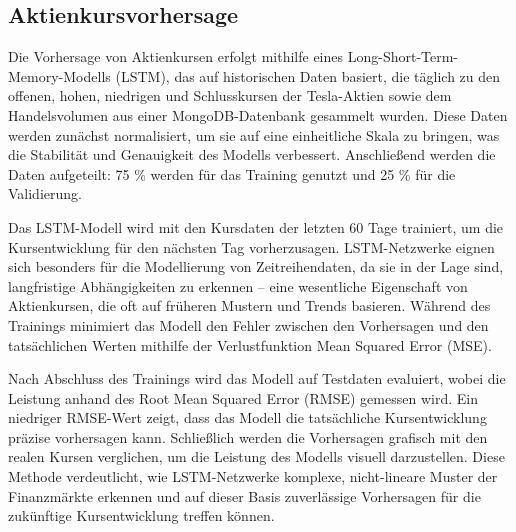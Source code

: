 \documentclass[conference,a4paper,flushend]{cs-techrep}
\begin{document}
\subsection{Aktienkursvorhersage}
Die Vorhersage von Aktienkursen erfolgt mithilfe eines Long-Short-Term-Memory-Modells (LSTM), das auf historischen Daten basiert, die täglich zu den offenen, hohen, niedrigen und Schlusskursen der Tesla-Aktien sowie dem Handelsvolumen aus einer MongoDB-Datenbank gesammelt wurden. Diese Daten werden zunächst normalisiert, um sie auf eine einheitliche Skala zu bringen, was die Stabilität und Genauigkeit des Modells verbessert. Anschließend werden die Daten aufgeteilt: 75 \% werden für das Training genutzt und 25 \% für die Validierung.

Das LSTM-Modell wird mit den Kursdaten der letzten 60 Tage trainiert, um die Kursentwicklung für den nächsten Tag vorherzusagen. LSTM-Netzwerke eignen sich besonders für die Modellierung von Zeitreihendaten, da sie in der Lage sind, langfristige Abhängigkeiten zu erkennen – eine wesentliche Eigenschaft von Aktienkursen, die oft auf früheren Mustern und Trends basieren. Während des Trainings minimiert das Modell den Fehler zwischen den Vorhersagen und den tatsächlichen Werten mithilfe der Verlustfunktion Mean Squared Error (MSE).

Nach Abschluss des Trainings wird das Modell auf Testdaten evaluiert, wobei die Leistung anhand des Root Mean Squared Error (RMSE) gemessen wird. Ein niedriger RMSE-Wert zeigt, dass das Modell die tatsächliche Kursentwicklung präzise vorhersagen kann. Schließlich werden die Vorhersagen grafisch mit den realen Kursen verglichen, um die Leistung des Modells visuell darzustellen. Diese Methode verdeutlicht, wie LSTM-Netzwerke komplexe, nicht-lineare Muster der Finanzmärkte erkennen und auf dieser Basis zuverlässige Vorhersagen für die zukünftige Kursentwicklung treffen können.
\end{document}
